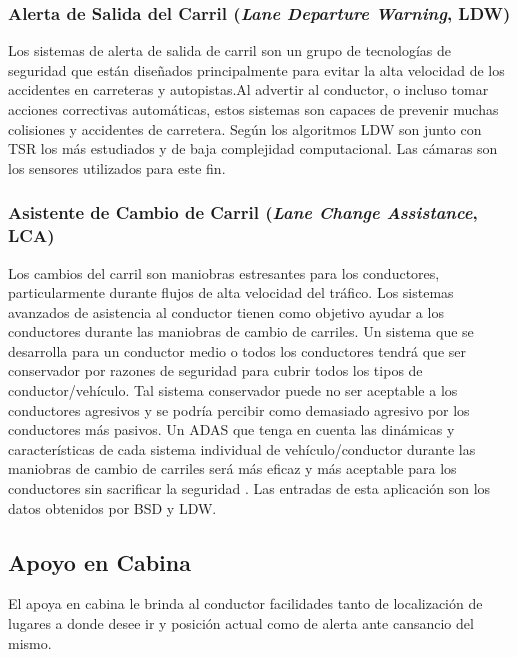 \subsubsection{Alerta de Salida del Carril  {\footnotesize(\textit{Lane Departure Warning}, LDW)}}

Los sistemas de alerta de salida de carril son un grupo de tecnologías de seguridad que están diseñados principalmente para evitar la alta velocidad de los accidentes en carreteras y autopistas.Al advertir al conductor, o incluso tomar acciones correctivas automáticas, estos sistemas son capaces de prevenir muchas colisiones y accidentes de carretera. Según \cite{Otaegui2016} los algoritmos LDW son junto con TSR los más estudiados y de baja complejidad computacional. Las cámaras son los sensores utilizados para este fin. 

\subsubsection{Asistente de Cambio de Carril {\footnotesize(\textit{Lane Change Assistance}, LCA)}}

Los cambios del carril son maniobras estresantes para los conductores, particularmente durante flujos de alta velocidad del tráfico. Los sistemas avanzados de asistencia al conductor tienen como objetivo ayudar a los conductores durante las maniobras de cambio de carriles. Un sistema que se desarrolla para un conductor medio o todos los conductores tendrá que ser conservador por razones de seguridad para cubrir todos los tipos de conductor/vehículo. Tal sistema conservador puede no ser aceptable a los conductores agresivos y se podría percibir como demasiado agresivo por los conductores más pasivos. Un ADAS que tenga en cuenta las dinámicas y características de cada sistema individual de vehículo/conductor durante las maniobras de cambio de carriles será más eficaz y más aceptable para los conductores sin sacrificar la seguridad \cite{Butakov2015}. Las entradas de esta aplicación son los datos obtenidos por BSD y LDW.

\newpage

\subsection{Apoyo en Cabina}

El apoya en cabina le brinda al conductor facilidades tanto de localización de lugares a donde desee ir y posición actual como de alerta ante cansancio del mismo. 

